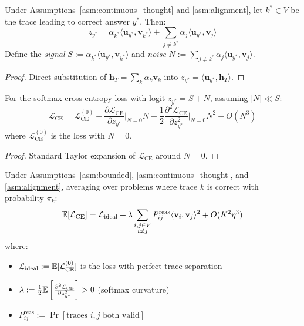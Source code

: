 \begin{lemma}
\label{lem:logit_decomp}
Under Assumptions~\ref{asm:continuous_thought} and \ref{asm:alignment}, let $k^* \in V$ be the trace leading to correct answer $y^*$. Then:
\begin{equation}
z_{y^*} = \alpha_{k^*} \langle \mathbf{u}_{y^*}, \mathbf{v}_{k^*} \rangle + \sum_{j \neq k^*} \alpha_j \langle \mathbf{u}_{y^*}, \mathbf{v}_j \rangle
\end{equation}
Define the \emph{signal} $S := \alpha_{k^*} \langle \mathbf{u}_{y^*}, \mathbf{v}_{k^*} \rangle$ and \emph{noise} $N := \sum_{j \neq k^*} \alpha_j \langle \mathbf{u}_{y^*}, \mathbf{v}_j \rangle$.
\end{lemma}

\begin{proof}
Direct substitution of $\mathbf{h}_T = \sum_k \alpha_k \mathbf{v}_k$ into $z_{y^*} = \langle \mathbf{u}_{y^*}, \mathbf{h}_T \rangle$.
\end{proof}

\begin{lemma}
\label{lem:ce_expansion}
For the softmax cross-entropy loss with logit $z_{y^*} = S + N$, assuming $|N| \ll S$:
\begin{equation}
\mathcal{L}_{\text{CE}} = \mathcal{L}_{\text{CE}}^{(0)} - \frac{\partial \mathcal{L}_{\text{CE}}}{\partial z_{y^*}}\bigg|_{N=0} N + \frac{1}{2} \frac{\partial^2 \mathcal{L}_{\text{CE}}}{\partial z_{y^*}^2}\bigg|_{N=0} N^2 + O(N^3)
\end{equation}
where $\mathcal{L}_{\text{CE}}^{(0)}$ is the loss with $N = 0$.
\end{lemma}

\begin{proof}
Standard Taylor expansion of $\mathcal{L}_{\text{CE}}$ around $N = 0$.
\end{proof}

\begin{proposition}
\label{prop:ce_interference}
Under Assumptions~\ref{asm:bounded}, \ref{asm:continuous_thought}, and \ref{asm:alignment}, averaging over problems where trace $k$ is correct with probability $\pi_k$:
\begin{equation}
\mathbb{E}[\mathcal{L}_{\text{CE}}] = \mathcal{L}_{\text{ideal}} + \lambda \sum_{\substack{i, j \in V \\ i \neq j}} P^{\text{reas}}_{ij} \langle \mathbf{v}_i, \mathbf{v}_j \rangle^2 + O(K^2 \eta^3)
\end{equation}
where:
\begin{itemize}
    \item $\mathcal{L}_{\text{ideal}} := \mathbb{E}[\mathcal{L}_{\text{CE}}^{(0)}]$ is the loss with perfect trace separation
    \item $\lambda := \frac{1}{2} \mathbb{E}\left[\frac{\partial^2 \mathcal{L}_{\text{CE}}}{\partial z_{y^*}^2}\right] > 0$ (softmax curvature)
    \item $P^{\text{reas}}_{ij} := \Pr[\text{traces } i, j \text{ both valid}]$
\end{itemize}
\end{proposition}

